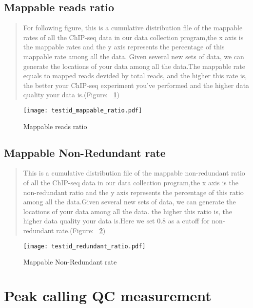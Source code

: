 \documentclass[11pt,a4paper]{article}
\begin{document}
\subsection{Mappable reads ratio}
\begin{quotation}
For following figure, this is a cumulative distribution file of the mappable rates of all the ChIP-seq data in our data collection program,the x axis is the mappable rates and the y axis represents the percentage of this mappable rate among all the data. Given several new sets of data, we can generate the locations of your data among all the data.The mappable rate equals to mapped reads devided by total reads, and the higher this rate is, the better your ChIP-seq experiment you've performed and the higher data quality your data is.(Figure: ~\ref{fig:mappinratio})
\end{quotation}
\begin{figure}[h] 
\caption{Mappable reads ratio} \label{fig:mappinratio}
\setlength{\abovecaptionskip}{0pt} 
\setlength{\belowcaptionskip}{10pt}
\centering
{\texttt{[image: testid\_mappable\_ratio.pdf]}}
\end{figure}
\newpage

\subsection{Mappable Non-Redundant rate}
\begin{quotation}
This is a cumulative distribution file of the mappable non-redundant ratio of all the ChIP-seq data in our data collection program,the x axis is the non-redundant ratio and the y axis represents the percentage of this ratio among all the data.Given several new sets of data, we can generate the locations of your data among all the data. the higher this ratio is, the higher data quality your data is.Here we set 0.8 as a cutoff for non-redundant rate.(Figure: ~\ref{fig:uni})
\end{quotation}
\begin{figure}[h] 
\caption{Mappable Non-Redundant rate} \label{fig:uni}
\setlength{\abovecaptionskip}{0pt} 
\setlength{\belowcaptionskip}{10pt}
\centering
{\texttt{[image: testid\_redundant\_ratio.pdf]}}
\end{figure}
\newpage

\section{Peak calling QC measurement}
\end{document}
